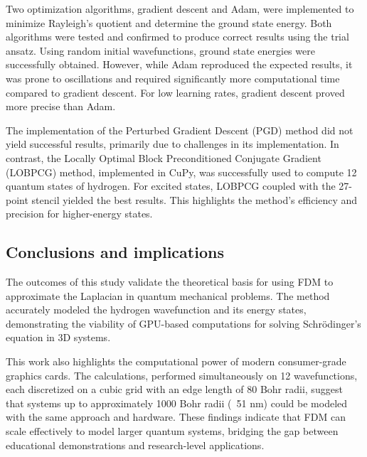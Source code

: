 Two optimization algorithms, gradient descent and Adam, were implemented to minimize Rayleigh's quotient and determine the ground state energy. Both algorithms were tested and confirmed to produce correct results using the trial ansatz. Using random initial wavefunctions, ground state energies were successfully obtained. However, while Adam reproduced the expected results, it was prone to oscillations and required significantly more computational time compared to gradient descent. For low learning rates, gradient descent proved more precise than Adam.

The implementation of the Perturbed Gradient Descent (PGD) method did not yield successful results, primarily due to challenges in its implementation. In contrast, the Locally Optimal Block Preconditioned Conjugate Gradient (LOBPCG) method, implemented in CuPy, was successfully used to compute 12 quantum states of hydrogen. For excited states, LOBPCG coupled with the 27-point stencil yielded the best results. This highlights the method’s efficiency and precision for higher-energy states.

\subsection{Conclusions and implications}

%
%
%
The outcomes of this study validate the theoretical basis for using FDM to approximate the Laplacian in quantum mechanical problems. The method accurately modeled the hydrogen wavefunction and its energy states, demonstrating the viability of GPU-based computations for solving Schrödinger's equation in 3D systems.

This work also highlights the computational power of modern consumer-grade graphics cards. The calculations, performed simultaneously on 12 wavefunctions, each discretized on a cubic grid with an edge length of 80 Bohr radii, suggest that systems up to approximately 1000 Bohr radii (~51 nm) could be modeled with the same approach and hardware. These findings indicate that FDM can scale effectively to model larger quantum systems, bridging the gap between educational demonstrations and research-level applications.

